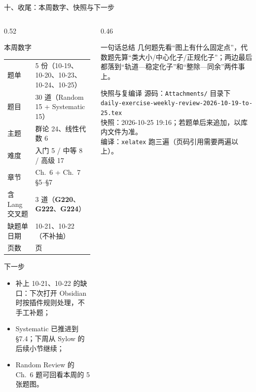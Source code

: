 \documentclass[aspectratio=169,10pt,fontset=none]{ctexbeamer}
\newcommand{\ex}[1]{\textcolor{accent}{\footnotesize\bfseries #1}}
\begin{document}
\begin{frame}[t]{十、收尾：本周数字、快照与下一步}
  \label{sec:closing}
  \begin{columns}[T,onlytextwidth]
    \begin{column}{0.52\textwidth}
      \begin{block}{\footnotesize 本周数字}
        \scriptsize
        \renewcommand{\arraystretch}{1.14}
        \begin{tabular}{@{}ll@{}}
          题单 & 5 份（10-19、10-20、10-23、10-24、10-25）\\
          题目 & 30 道（Random 15 + Systematic 15）\\
          主题 & 群论 24、线性代数 6\\
          难度 & 入门 5 / 中等 8 / 高级 17\\
          章节 & Ch.~6 + Ch.~7 \S5--\S7\\
          含 Lang 交叉题 & 3 道（\ex{G220}、\ex{G222}、\ex{G224}）\\
          缺题单日期 & 10-21、10-22（不补抽）\\
          页数 & \inserttotalframenumber{} 页\\
        \end{tabular}
      \end{block}
      \begin{exampleblock}{\footnotesize 下一步}
        \scriptsize
        \begin{itemize}\setlength{\itemsep}{1pt}
          \item 补上 10-21、10-22 的缺口：下次打开 Obsidian 时按插件规则处理，不手工补题；
          \item Systematic 已推进到 \S7.4；下周从 Sylow 的后续小节继续；
          \item Random Review 的 Ch.~6 题可回看本周的 5 张题图。
        \end{itemize}
      \end{exampleblock}
    \end{column}
    \begin{column}{0.46\textwidth}
      \begin{block}{\footnotesize 一句话总结}
        \scriptsize
        几何题先看“图上有什么固定点”，代数题先算“类大小/中心化子/正规化子”；两边最后都落到“轨道—稳定化子”和“整除—同余”两件事上。
      \end{block}
      \begin{block}{\footnotesize 快照与复编译}
        \scriptsize
        源码：\texttt{Attachments/} 目录下\\
        {\tiny\texttt{daily-exercise-weekly-review-2026-10-19-to-25.tex}}\\
        快照：2026-10-25 19:16；若题单后来追加，以库内文件为准。\\
        编译：\texttt{xelatex} 跑三遍（页码引用需要两遍以上）。
      \end{block}
    \end{column}
  \end{columns}
\end{frame}
\end{document}
